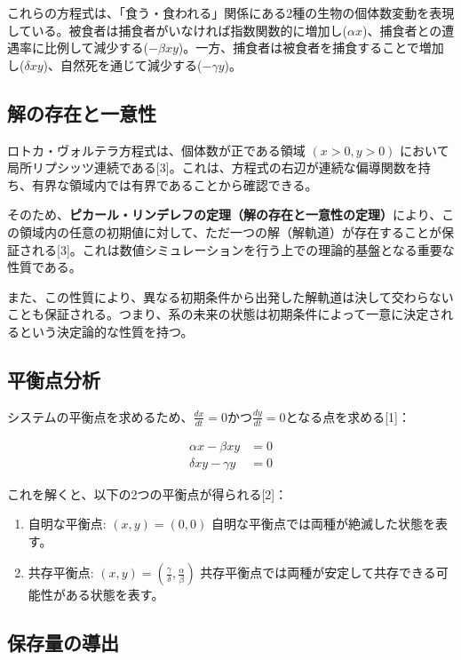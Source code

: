 \documentclass{article}
\begin{document}
これらの方程式は、「食う・食われる」関係にある2種の生物の個体数変動を表現している。被食者は捕食者がいなければ指数関数的に増加し($\alpha x$)、捕食者との遭遇率に比例して減少する($-\beta xy$)。一方、捕食者は被食者を捕食することで増加し($\delta xy$)、自然死を通じて減少する($-\gamma y$)。

\subsection{解の存在と一意性}

ロトカ・ヴォルテラ方程式は、個体数が正である領域 $(x>0,y>0)$ において局所リプシッツ連続である[3]。これは、方程式の右辺が連続な偏導関数を持ち、有界な領域内では有界であることから確認できる。

そのため、\textbf{ピカール・リンデレフの定理（解の存在と一意性の定理）}により、この領域内の任意の初期値に対して、ただ一つの解（解軌道）が存在することが保証される[3]。これは数値シミュレーションを行う上での理論的基盤となる重要な性質である。

また、この性質により、異なる初期条件から出発した解軌道は決して交わらないことも保証される。つまり、系の未来の状態は初期条件によって一意に決定されるという決定論的な性質を持つ。

\subsection{平衡点分析}

システムの平衡点を求めるため、$\frac{dx}{dt} = 0$かつ$\frac{dy}{dt} = 0$となる点を求める[1]：

\begin{align}
\alpha x - \beta xy &= 0 \\
\delta xy - \gamma y &= 0
\end{align}

これを解くと、以下の2つの平衡点が得られる[2]：

\begin{enumerate}
\item 自明な平衡点: $(x, y) = (0, 0)$
自明な平衡点では両種が絶滅した状態を表す。

\item 共存平衡点: $(x, y) = (\frac{\gamma}{\delta}, \frac{\alpha}{\beta})$
共存平衡点では両種が安定して共存できる可能性がある状態を表す。
\end{enumerate}

\subsection{保存量の導出}
\end{document}
